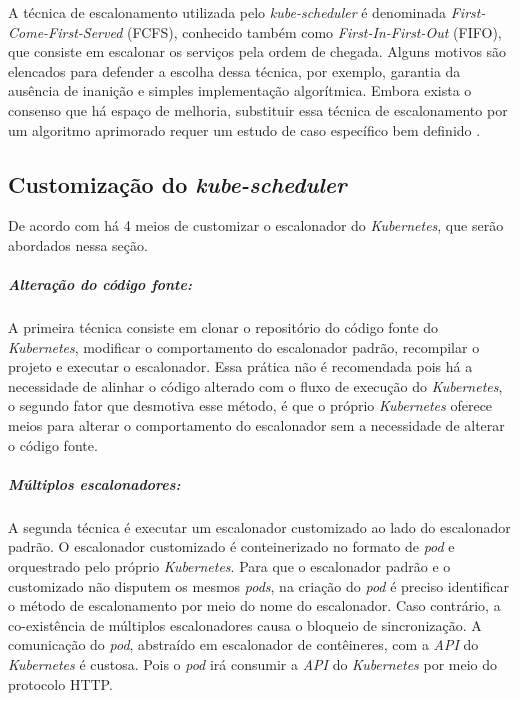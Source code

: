 A técnica de escalonamento utilizada pelo \textit{kube-scheduler} é denominada \textit{First-Come-First-Served} (FCFS), conhecido também como \textit{First-In-First-Out} (FIFO), que consiste em escalonar os serviços pela ordem de chegada. Alguns motivos são elencados para defender a escolha dessa técnica, por exemplo, garantia da ausência de inanição e simples implementação algorítmica. Embora exista o consenso que há espaço de melhoria, substituir essa técnica de escalonamento por um algoritmo aprimorado 
requer um estudo de caso específico bem definido \cite{CarastanSantos2019}.

\subsection{Customização do \textit{kube-scheduler}}
\label{customizacao_kube_scheduler}
De acordo com  há 4 meios de customizar o escalonador do \textit{Kubernetes}, que serão abordados nessa seção.

\subparagraph{Alteração do código fonte:}
A primeira técnica consiste em clonar o repositório do código fonte do \textit{Kubernetes}, modificar o comportamento do escalonador padrão, recompilar o projeto e executar o escalonador. Essa prática não é recomendada pois há a necessidade de alinhar o código alterado com o fluxo de execução do \textit{Kubernetes}, o segundo fator que desmotiva esse método, é que o próprio \textit{Kubernetes} oferece meios para alterar o comportamento do escalonador sem a necessidade de alterar o código fonte.

\subparagraph{Múltiplos escalonadores:}
A segunda técnica é executar um escalonador customizado ao lado do escalonador padrão. O escalonador customizado é conteinerizado no formato de \textit{pod} e orquestrado pelo próprio \textit{Kubernetes}. Para que o escalonador padrão e o customizado não disputem os mesmos \textit{pods}, na criação do \textit{pod} é preciso identificar o método de escalonamento por meio do nome do escalonador. Caso contrário, a co-existência de múltiplos escalonadores causa o bloqueio de sincronização. A comunicação do \textit{pod}, abstraído em escalonador de contêineres, com a \textit{API} do \textit{Kubernetes} é custosa. Pois o \textit{pod} irá consumir a \textit{API} do \textit{Kubernetes} por meio do protocolo \ac{HTTP}.


